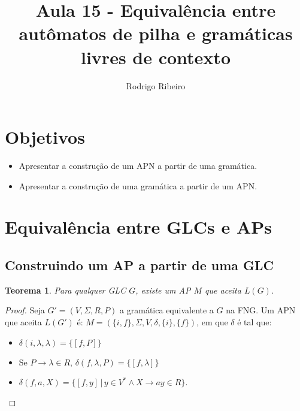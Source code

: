 \documentclass[a4paper]{article}
\newtheorem{Theorem}{Teorema}
\theoremstyle{definition}
\begin{document}
  \title{Aula 15 - Equivalência entre autômatos de pilha e gramáticas livres de contexto}
  \author{Rodrigo Ribeiro}

  \maketitle


  \pagestyle{fancy}


  \section*{Objetivos}

  \begin{itemize}
     \item Apresentar a construção de um APN a partir de uma gramática.
     \item Apresentar a construção de uma gramática a partir de um APN.     
  \end{itemize}

  \section{Equivalência entre GLCs e APs}

  \subsection{Construindo um AP a partir de uma GLC}

  \begin{Theorem}
    Para qualquer GLC $G$, existe um AP $M$ que aceita $L(G)$.
  \end{Theorem}
  \begin{proof}
    Seja $G' = (V,\Sigma,R,P)$ a gramática equivalente a $G$ na FNG.
    Um APN que aceita $L(G')$ é: $M=(\{i,f\},\Sigma, V, \delta,\{i\},\{f\})$,
    em que $\delta$ é tal que:
    \begin{itemize}
      \item $\delta(i,\lambda,\lambda) = \{[f, P]\}$
      \item Se $P \to \lambda \in R,\,\delta(f,\lambda,P) = \{[f,\lambda]\}$
      \item $\delta(f, a, X) = \{[f,y]\,|\,y \in V^* \land X \to ay \in R\}$.
    \end{itemize}
  \end{proof}
\end{document}
